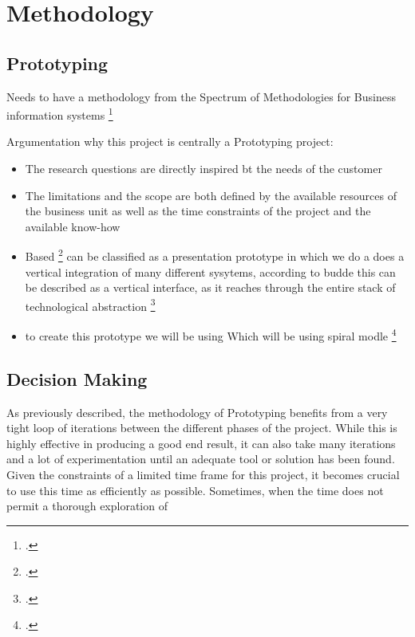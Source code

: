 \chapter{Methodology}
\label{methodology}

\section{Prototyping}

Needs to have a methodology from the Spectrum of Methodologies for Business information systems \footcite{wildeMethodenspektrumWirtschaftsinformatikUeberblick}


Argumentation why this project is centrally a Prototyping project:

\begin{itemize}
    \item  The research questions are directly inspired bt the needs of the customer
    \item   The limitations and the scope are both defined by the available resources of the business unit as well as the time constraints of the project and the available know-how
    \item Based \footcite[p. 91]{buddeWhatPrototyping1992} can be classified as a presentation prototype in which we do a  does a vertical integration of many different sysytems, according to budde this can be described as a vertical interface, as it reaches through the entire stack of technological abstraction \footcite[p. 94]{buddeWhatPrototyping1992}    \
    \item to create this prototype we will be using  Which  will be using spiral modle \footcite{boehmSpiralModelSoftware1988} 
\end{itemize} 

\newpage


\section{Decision Making}
\label{decision_making}

As previously described, the methodology of Prototyping benefits from a very tight loop of iterations between the different phases of the project.
While this is highly effective in producing a good end result, it can also take many iterations and a lot of experimentation until an adequate tool or solution has been found.
Given the constraints of a limited time frame for this project, it becomes crucial to use this time as efficiently as possible.
Sometimes, when the time does not permit a thorough exploration of 

